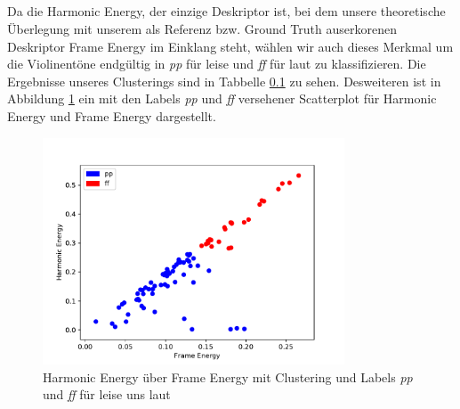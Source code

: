\subsection{}

Da die Harmonic Energy, der einzige Deskriptor ist, bei dem unsere theoretische Überlegung mit unserem als Referenz bzw. Ground Truth auserkorenen Deskriptor Frame Energy im Einklang steht, wählen wir auch dieses Merkmal um die Violinentöne endgültig in \textit{pp} für leise und \textit{ff} für laut zu klassifizieren. 
Die Ergebnisse unseres Clusterings sind in Tabbelle \ref{} zu sehen.
Desweiteren ist in Abbildung \ref{fig:harmonic_energy_c_l} ein mit den Labels \textit{pp} und \textit{ff} versehener Scatterplot für Harmonic Energy und Frame Energy dargestellt.

\begin{figure}[H]
    \center
    \includegraphics[width = 0.8\textwidth]{Figures/harmonic_energy_c_l}
    \caption{Harmonic Energy über Frame Energy mit Clustering und Labels \textit{pp} und \textit{ff} für leise uns laut}
    \label{fig:harmonic_energy_c_l}
\end{figure}
